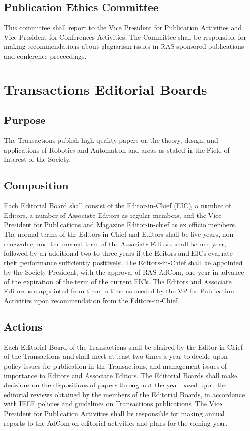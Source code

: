 \documentclass[10pt]{article}
\begin{document}
\subsection{Publication Ethics Committee}

This committee shall report to the Vice President for Publication Activities and Vice President for Conferences Activities. The Committee shall be responsible for making recommendations about plagiarism issues in RAS-sponsored publications and conference proceedings.


\section{Transactions Editorial Boards}
\label{TEB}

\subsection{Purpose}

The Transactions publish high-quality papers on the theory, design, and applications of Robotics and Automation and areas as stated in the Field of Interest of the Society.

\subsection{Composition}
\label{TEB:Composition}
Each Editorial Board shall consist of the Editor-in-Chief (EIC), a number of Editors, a number of Associate Editors as regular members, and the Vice President for Publications and Magazine Editor-in-chief as ex officio members.  The normal terms of the Editors-in-Chief and Editors shall be five years, non-renewable, and the normal term of the Associate Editors shall be one year, followed by an additional two to three years if the Editors and EICs evaluate their performance sufficiently positively. The Editors-in-Chief shall be appointed by the Society President, with the approval of RAS AdCom, one year in advance of the expiration of the term of the current EICs. The Editors and Associate Editors are appointed from time to time as needed by the VP for Publication Activities upon recommendation from the Editors-in-Chief.

\subsection{Actions}

Each Editorial Board of the Transactions shall be chaired by the Editor-in-Chief of the Transactions and shall meet at least two times a year to decide upon policy issues for publication in the Transactions, and management issues of importance to Editors and Associate Editors.  The Editorial Boards shall make decisions on the dispositions of papers throughout the year based upon the editorial reviews obtained by the members of the Editorial Boards, in accordance with IEEE policies and guidelines on Transactions publications. The Vice President for Publication Activities shall be responsible for making annual reports to the AdCom on editorial activities and plans for the coming year. 
\end{document}
